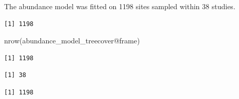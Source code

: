\documentclass[
  letterpaper,
  DIV=11,
  numbers=noendperiod]{scrartcl}
\newenvironment{Shaded}{\begin{snugshade}}{\end{snugshade}}
\newcommand{\DocumentationTok}[1]{\textcolor[rgb]{0.37,0.37,0.37}{\textit{#1}}}
\newcommand{\FunctionTok}[1]{\textcolor[rgb]{0.28,0.35,0.67}{#1}}
\newcommand{\NormalTok}[1]{\textcolor[rgb]{0.00,0.23,0.31}{#1}}
\newcommand{\OtherTok}[1]{\textcolor[rgb]{0.00,0.23,0.31}{#1}}
\newcommand{\SpecialCharTok}[1]{\textcolor[rgb]{0.37,0.37,0.37}{#1}}
\begin{document}
The abundance model was fitted on 1198 sites sampled within 38 studies.

\begin{Shaded}
\end{Shaded}

\begin{verbatim}
[1] 1198
\end{verbatim}

\begin{Shaded}
\begin{Highlighting}[]
\FunctionTok{nrow}\NormalTok{(abundance\_model\_treecover}\SpecialCharTok{@}\NormalTok{frame)}
\end{Highlighting}
\end{Shaded}

\begin{verbatim}
[1] 1198
\end{verbatim}

\begin{Shaded}
\end{Shaded}

\begin{verbatim}
[1] 38
\end{verbatim}

\begin{Shaded}
\end{Shaded}

\begin{verbatim}
[1] 1198
\end{verbatim}
\end{document}
